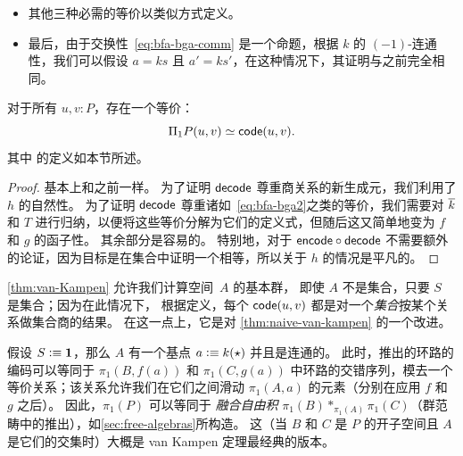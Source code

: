 \begin{itemize}
  现在假设 $t$ 沿着某个 $w:ks=ks'$ 对应的 $m_{s,s'}(w)$ 变化；我们必须证明~\eqref{eq:bfa-bga2} 尊重沿着 $\kbar mw$ 的传输。
  根据 $\kbar$ 的定义，这本质上可归结为沿 $w$ 本身的传输。
  由道路类型中传输的特征描述，我们需要证明的是：
  \[ w_*(\dots, y_n, p_n,fks) = (\dots,y_n, p_n \ct fw, fks') \]
  被~\eqref{eq:bfa-bga2} 映射到
  \[ w_*(\dots,y_n,p_n,s,\refl{gks},gks) = (\dots, y_n, p_n, s, \refl{gks} \ct gw, gks') \]
  但这直接由定义 \code 的集合商时所施加的新生成元得出。
\item 其他三种必需的等价以类似方式定义。
\item 最后，由于交换性~\eqref{eq:bfa-bga-comm} 是一个命题，根据 $k$ 的 $(-1)$-连通性，我们可以假设 $a=ks$ 且 $a'=ks'$，在这种情况下，其证明与之前完全相同。
\end{itemize}

\begin{thm}\label{thm:van-Kampen}
  对于所有 $u,v:P$，存在一个等价：
  \[ \Pi_1P(u,v) \simeq \mathsf{code}(u,v). \]
  其中 \code 的定义如本节所述。
\end{thm}

\begin{proof}
  基本上和之前一样。
  为了证明 $\mathsf{decode}$ 尊重商关系的新生成元，我们利用了 $h$ 的自然性。
  为了证明 $\mathsf{decode}$ 尊重诸如~\eqref{eq:bfa-bga2}之类的等价，我们需要对 $\kbar$ 和 $T$ 进行归纳，以便将这些等价分解为它们的定义式，但随后这又简单地变为 $f$ 和 $g$ 的函子性。
  其余部分是容易的。
  特别地，对于 $\mathsf{encode}\circ\mathsf{decode}$ 不需要额外的论证，因为目标是在集合中证明一个相等，所以关于 $h$ 的情况是平凡的。
\end{proof}

%

%
\cref{thm:van-Kampen} 允许我们计算空间~$A$ 的基本群，
即使 $A$ 不是集合，只要 $S$ 是集合；因为在此情况下，
根据定义，每个 $\mathsf{code}(u,v)$ 都是对一个\emph{集合}按某个关系做集合商的结果。
在这一点上，它是对
\cref{thm:naive-van-kampen}
的一个改进。

\begin{eg}\label{eg:clvk}
  假设 $S\vcentcolon\equiv \mathbf{1}$，那么 $A$ 有一个基点 $a \vcentcolon\equiv k(\star)$ 并且是连通的。
  此时，推出的环路的编码可以等同于 $\pi_1(B,f(a))$ 和 $\pi_1(C,g(a))$ 中环路的交错序列，模去一个等价关系；该关系允许我们在它们之间滑动 $\pi_1(A,a)$ 的元素（分别在应用 $f$ 和 $g$ 之后）。
  因此，$\pi_1(P)$ 可以等同于 \emph{融合自由积}
  $\pi_1(B) *_{\pi_1(A)} \pi_1(C)$（群范畴中的推出），如\cref{sec:free-algebras}所构造。
  这（当 $B$ 和 $C$ 是 $P$ 的开子空间且 $A$ 是它们的交集时）大概是 van Kampen 定理最经典的版本。
\end{eg}

